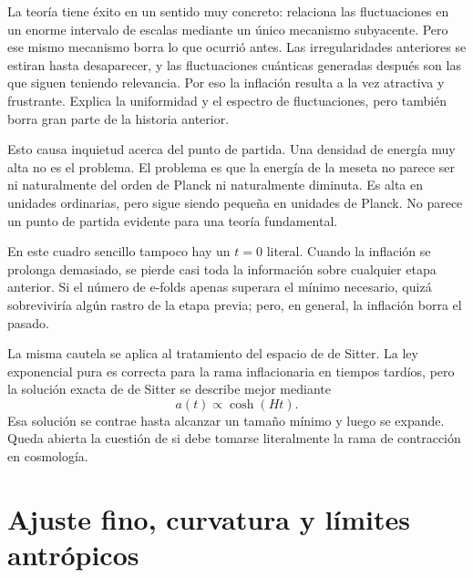 La teoría tiene éxito en un sentido muy concreto: relaciona las fluctuaciones en un enorme intervalo de escalas mediante un único mecanismo subyacente. Pero ese mismo mecanismo borra lo que ocurrió antes. Las irregularidades anteriores se estiran hasta desaparecer, y las fluctuaciones cuánticas generadas después son las que siguen teniendo relevancia. Por eso la inflación resulta a la vez atractiva y frustrante. Explica la uniformidad y el espectro de fluctuaciones, pero también borra gran parte de la historia anterior.

Esto causa inquietud acerca del punto de partida. Una densidad de energía muy alta no es el problema. El problema es que la energía de la meseta no parece ser ni naturalmente del orden de Planck ni naturalmente diminuta. Es alta en unidades ordinarias, pero sigue siendo pequeña en unidades de Planck. No parece un punto de partida evidente para una teoría fundamental.

En este cuadro sencillo tampoco hay un \(t=0\) literal. Cuando la inflación se prolonga demasiado, se pierde casi toda la información sobre cualquier etapa anterior. Si el número de e-folds apenas superara el mínimo necesario, quizá sobreviviría algún rastro de la etapa previa; pero, en general, la inflación borra el pasado.

La misma cautela se aplica al tratamiento del espacio de de Sitter. La ley exponencial pura es correcta para la rama inflacionaria en tiempos tardíos, pero la solución exacta de de Sitter se describe mejor mediante
\begin{equation}
a(t)\propto \cosh(Ht).
\end{equation}
Esa solución se contrae hasta alcanzar un tamaño mínimo y luego se expande. Queda abierta la cuestión de si debe tomarse literalmente la rama de contracción en cosmología.

\begin{classroomqa}
\end{classroomqa}

\section{Ajuste fino, curvatura y límites antrópicos}

